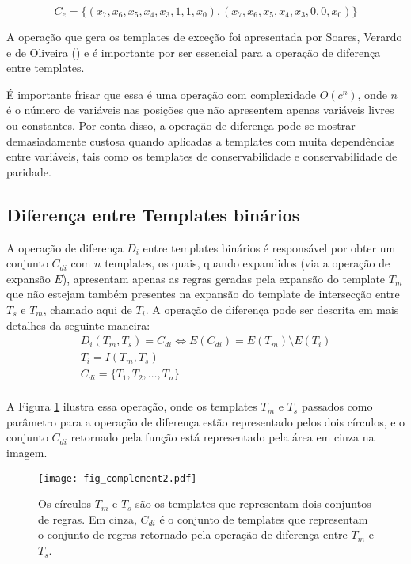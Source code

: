 \begin{equation}
C_e = \{(x_7, x_6, x_5, x_4, x_3, 1, 1, x_0),(x_7, x_6, x_5, x_4, x_3, 0, 0, x_0)\}
\label{eq:exceptionsTemplates2}
\end{equation}

A operação que gera os templates de exceção foi apresentada por Soares, Verardo e
de Oliveira (\citeyear{soares2016difference}) e é importante por ser essencial para a operação de diferença entre templates. 

É importante frisar que essa é uma operação com complexidade $O(c^n)$, onde $n$ é o número de variáveis nas posições que não apresentem apenas variáveis livres ou constantes. Por conta disso, a operação de diferença pode se mostrar demasiadamente custosa quando aplicadas a templates com muita dependências entre variáveis, tais como os templates de conservabilidade e conservabilidade de paridade.

\subsection{Diferença entre Templates binários}
A operação de diferença $D_i$ entre templates binários é responsável por obter um conjunto $C_{di}$ com $n$ templates, os quais, quando expandidos (via a operação de expansão $E$), apresentam apenas as regras geradas pela expansão do template $T_m$ que não estejam também presentes na expansão do template de intersecção entre $T_s$ e $T_m$, chamado aqui de $T_i$. A operação de diferença pode ser descrita em mais detalhes da seguinte maneira:
\begin{equation}
\begin{split}
D_i(T_m,T_s)= C_{di} \Leftrightarrow E(C_{di}) = E(T_m) \setminus E(T_i) \\
T_i = I(T_m,T_s)\\
C_{di} = \{T_1,T_2,\dots, T_n\}\\
\end{split}
\end{equation}

A Figura \ref{fig:complement} ilustra essa operação, onde os templates $T_m$ e $T_s$ passados como parâmetro para a operação de diferença estão representado pelos dois círculos, e o conjunto $C_{di}$ retornado pela função está representado pela área em cinza na imagem.
\begin{figure}[h!]
  \centering
  \texttt{[image: fig\_complement2.pdf]}
  \caption{Os círculos $T_m$ e $T_s$ são os templates que representam dois conjuntos de regras. Em cinza, $C_{di}$ é o conjunto de templates que representam o conjunto de regras retornado pela operação de diferença entre $T_m$ e $T_s$.}
  \label{fig:complement}
\end{figure}    

